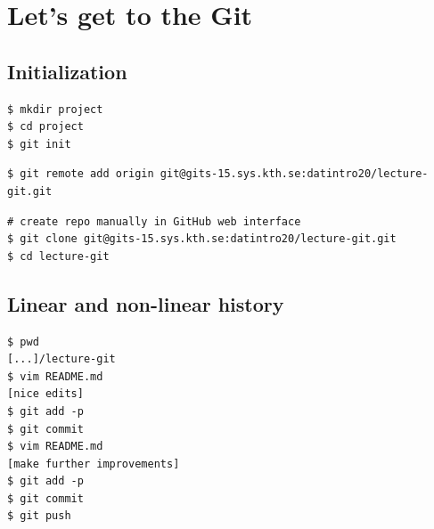 \section{Let's get to the Git}

\subsection{Initialization}

\begin{frame}[fragile]
  \begin{example}[No remote]
    \begin{lstlisting}
$ mkdir project
$ cd project
$ git init
    \end{lstlisting}
  \end{example}

  \pause

  \begin{example}
    \begin{lstlisting}
$ git remote add origin git@gits-15.sys.kth.se:datintro20/lecture-git.git
    \end{lstlisting}
  \end{example}
\end{frame}

\begin{frame}[fragile]
  \begin{example}
    \begin{lstlisting}
# create repo manually in GitHub web interface
$ git clone git@gits-15.sys.kth.se:datintro20/lecture-git.git
$ cd lecture-git
    \end{lstlisting}
  \end{example}
\end{frame}

\subsection{Linear and non-linear history}

\begin{frame}[fragile]
  \begin{example}[Linear]
    \begin{lstlisting}
$ pwd
[...]/lecture-git
$ vim README.md
[nice edits]
$ git add -p
$ git commit
$ vim README.md
[make further improvements]
$ git add -p
$ git commit
$ git push
    \end{lstlisting}
  \end{example}
\end{frame}

